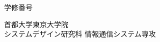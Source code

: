 \newpage
\thispagestyle{empty}
{\raggedleft
  \normalsize 学修番号 \studentnumber \\
}
\vspace*{9truemm}
\begin{center}
 \Large\bf\jdoctitle
\end{center}
\vspace*{27truemm}
\begin{center}
 \Large\bf\jtitle
\end{center}
\vspace*{18truemm}
\begin{center}
 \Large\jauthor
\end{center}
\vspace*{50truemm}
\begin{center}
 \jdate
\end{center}
\vspace*{4.5truemm}
\begin{center}
 首都大学東京大学院 \\
 システムデザイン研究科 情報通信システム専攻
\end{center}
\vspace*{\fill}


